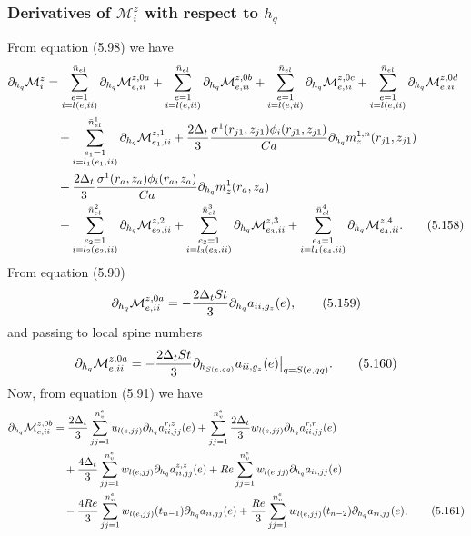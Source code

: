\documentclass{article}
\begin{document}
\subsubsection{Derivatives of $\mathcal{M}_i^z$ with respect to $h_q$} %
From equation (5.98) we have
\begin{align}
\partial_{h_q}\mathcal{M}_i^z &= \sum_{\substack{e=1\\ i=l(e,ii)}}^{\bar{n}_{el}} \partial_{h_q} \mathcal{M}_{e,ii}^{z,0a} + \sum_{\substack{e=1\\ i=l(e,ii)}}^{\bar{n}_{el}} \partial_{h_q} \mathcal{M}_{e,ii}^{z,0b} + \sum_{\substack{e=1\\ i=l(e,ii)}}^{\bar{n}_{el}} \partial_{h_q} \mathcal{M}_{e,ii}^{z,0c} + \sum_{\substack{e=1\\ i=l(e,ii)}}^{\bar{n}_{el}} \partial_{h_q} \mathcal{M}_{e,ii}^{z,0d} \nonumber\\
&\quad + \sum_{\substack{e_1=1\\ i=l_1(e_1,ii)}}^{\bar{n}_{el}^1} \partial_{h_q} \mathcal{M}_{e_1,ii}^{z,1} + \frac{2\Delta_t}{3} \frac{\sigma^1(r_{j1},z_{j1}) \phi_i(r_{j1},z_{j1})}{Ca} \partial_{h_q} m_z^{1,n}(r_{j1},z_{j1}) \nonumber\\
&\quad + \frac{2\Delta_t}{3} \frac{\sigma^1(r_a,z_a) \phi_i(r_a,z_a)}{Ca} \partial_{h_q} m_z^{1}(r_a,z_a) \nonumber\\
&\quad + \sum_{\substack{e_2=1\\ i=l_2(e_2,ii)}}^{\bar{n}_{el}^2} \partial_{h_q} \mathcal{M}_{e_2,ii}^{z,2} + \sum_{\substack{e_3=1\\ i=l_3(e_3,ii)}}^{\bar{n}_{el}^3} \partial_{h_q} \mathcal{M}_{e_3,ii}^{z,3} + \sum_{\substack{e_4=1\\ i=l_4(e_4,ii)}}^{\bar{n}_{el}^4} \partial_{h_q} \mathcal{M}_{e_4,ii}^{z,4}. \tag{5.158}
\end{align}
From equation (5.90)
\begin{equation}
\partial_{h_q}\mathcal{M}_{e,ii}^{z,0a} = -\frac{2\Delta_t St}{3} \partial_{h_q} a_{ii,g_z}(e), \tag{5.159}
\end{equation}
and passing to local spine numbers
\begin{equation}
\partial_{h_q}\mathcal{M}_{e,ii}^{z,0a} = -\frac{2\Delta_t St}{3} \partial_{h_{S(e,qq)}} a_{ii,g_z}(e) \big|_{q=S(e,qq)}. \tag{5.160}
\end{equation}
Now, from equation (5.91) we have
\begin{align}
\partial_{h_q}\mathcal{M}_{e,ii}^{z,0b} &= \frac{2\Delta_t}{3} \sum_{jj=1}^{n_v^e} u_{l(e,jj)} \partial_{h_q} a_{ii,jj}^{r,z}(e) + \sum_{jj=1}^{n_v^e} \frac{2\Delta_t}{3} w_{l(e,jj)} \partial_{h_q} a_{ii,jj}^{r,r}(e) \nonumber\\
&\quad + \frac{4\Delta_t}{3} \sum_{jj=1}^{n_v^e} w_{l(e,jj)} \partial_{h_q} a_{ii,jj}^{z,z}(e) + Re \sum_{jj=1}^{n_v^e} w_{l(e,jj)} \partial_{h_q} a_{ii,jj}(e) \nonumber\\
&\quad - \frac{4Re}{3} \sum_{jj=1}^{n_v^e} w_{l(e,jj)}(t_{n-1}) \partial_{h_q} a_{ii,jj}(e) + \frac{Re}{3} \sum_{jj=1}^{n_v^e} w_{l(e,jj)}(t_{n-2}) \partial_{h_q} a_{ii,jj}(e), \tag{5.161}
\end{align}
\end{document}
